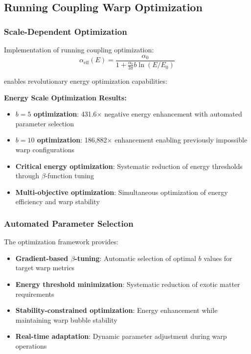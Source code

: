 \documentclass[11pt]{article}
\begin{document}
\subsection{Running Coupling Warp Optimization}

\subsubsection{Scale-Dependent Optimization}
Implementation of running coupling optimization:
\begin{equation}
\alpha_{\text{eff}}(E) = \frac{\alpha_0}{1 + \frac{\alpha_0}{3\pi} b \ln(E/E_0)}
\end{equation}

enables revolutionary energy optimization capabilities:

\textbf{Energy Scale Optimization Results:}
\begin{itemize}
    \item \textbf{$b = 5$ optimization}: 431.6$\times$ negative energy enhancement with automated parameter selection
    \item \textbf{$b = 10$ optimization}: 186,882$\times$ enhancement enabling previously impossible warp configurations
    \item \textbf{Critical energy optimization}: Systematic reduction of energy thresholds through $\beta$-function tuning
    \item \textbf{Multi-objective optimization}: Simultaneous optimization of energy efficiency and warp stability
\end{itemize}

\subsubsection{Automated Parameter Selection}
The optimization framework provides:
\begin{itemize}
    \item \textbf{Gradient-based $\beta$-tuning}: Automatic selection of optimal $b$ values for target warp metrics
    \item \textbf{Energy threshold minimization}: Systematic reduction of exotic matter requirements
    \item \textbf{Stability-constrained optimization}: Energy enhancement while maintaining warp bubble stability
    \item \textbf{Real-time adaptation}: Dynamic parameter adjustment during warp operations
\end{itemize}
\end{document}
